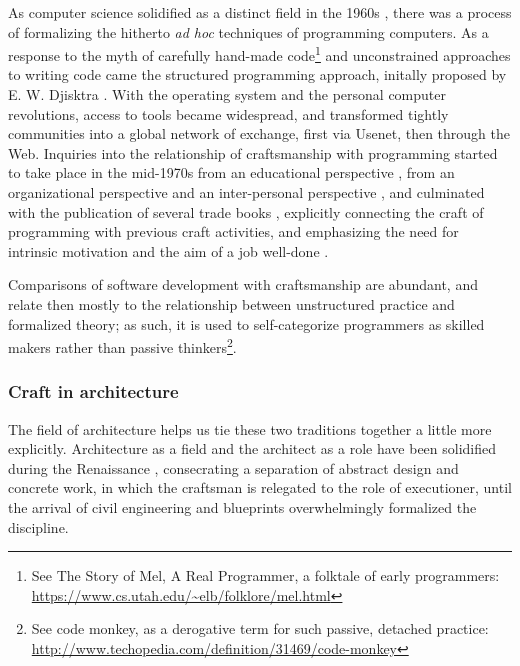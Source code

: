 As computer science solidified as a distinct field in the 1960s \citep{tedre_development_2006}, there was a process of formalizing the hitherto \textit{ad hoc} techniques of programming computers. As a response to the myth of carefully hand-made code\footnote{See The Story of Mel, A Real Programmer, a folktale of early programmers: \url{https://www.cs.utah.edu/~elb/folklore/mel.html}} and unconstrained approaches to writing code came the structured programming approach, initally proposed by E. W. Djisktra \citep{dijkstra_chapter_1972}. With the operating system and the personal computer revolutions, access to tools became widespread, and transformed tightly communities into a global network of exchange, first via Usenet, then through the Web. Inquiries into the relationship of craftsmanship with programming started to take place in the mid-1970s from an educational perspective \citep{dijkstra_craftsman_1982}, from an organizational perspective \citep{brooks_mythical_1975} and an inter-personal perspective \citep{weinberg_psychology_1998}, and culminated with the publication of several trade books \citep{martin_clean_2008,hendrickson_software_2002}, explicitly connecting the craft of programming with previous craft activities, and emphasizing the need for intrinsic motivation and the aim of a job well-done \citep{hoover_apprenticeship_2009,goodliffe_code_2007}.

Comparisons of software development with craftsmanship are abundant, and relate then mostly to the relationship between unstructured practice and formalized theory; as such, it is used to self-categorize programmers as skilled makers rather than passive thinkers\footnote{See code monkey, as a derogative term for such passive, detached practice: \url{http://www.techopedia.com/definition/31469/code-monkey}}.

\subsubsection{Craft in architecture}
\label{subsubsec:craft-architecture}

The field of architecture helps us tie these two traditions together a little more explicitly. Architecture as a field and the architect as a role have been solidified during the Renaissance \citep{pevsner_term_1942}, consecrating a separation of abstract design and concrete work, in which the craftsman is relegated to the role of executioner, until the arrival of civil engineering and blueprints overwhelmingly formalized the discipline.

